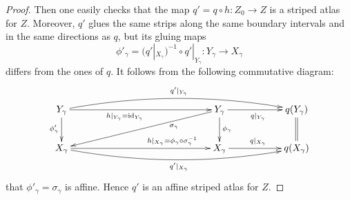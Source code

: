 \documentclass[12pt, reqno]{amsart}
\newcommand\dif{h}
\newcommand{\stripSurf}{Z}
\newcommand{\preStripSurf}{\stripSurf_0}
\newcommand{\bdX}{X}
\newcommand{\bdY}{Y}
\newcommand{\bdGlueInd}{{\gamma}}
\newcommand{\id}{\mathrm{id}}
\newcommand{\qmap}{q}
\begin{document}
\begin{proof}
Then one easily checks that the map $\qmap' = \qmap\circ\dif: \preStripSurf \to \stripSurf$ is a striped atlas for $\stripSurf$.
Moreover, $\qmap'$ glues the same strips along the same boundary intervals and in the same directions as $\qmap$, but its gluing maps
\[
\phi'_{\bdGlueInd} = \bigl(\qmap'|_{\bdX_{\bdGlueInd}}\bigr)^{-1} \circ  \qmap'|_{\bdY_{\bdGlueInd}}: \bdY_{\bdGlueInd} \to \bdX_{\bdGlueInd}
\]
differs from the ones of $\qmap$.
It follows from the following commutative diagram:
\[
\xymatrix{
\bdY_{\bdGlueInd} 
  \ar[rrrrr]_(.4){\dif|_{\bdY_{\bdGlueInd}} = \id_{\bdY_{\bdGlueInd}} } 
  \ar[d]_{\phi'_{\bdGlueInd}}
  \ar@/^1pc/[rrrrrrr]^{\qmap'|_{\bdY_\bdGlueInd}}
   &&&&&
\bdY_{\bdGlueInd}
  \ar[rr]_{\qmap|_{\bdY_{\bdGlueInd}}} 
  \ar[d]^{\phi_{\bdGlueInd} } 
  \ar[dlllll]^(.3){\sigma_{\bdGlueInd} } 
  &&
\qmap(\bdY_{\bdGlueInd}) 
  \ar@{=}[d] \\
\bdX_{\bdGlueInd} 
  \ar@/_1pc/[rrrrrrr]_{\qmap'|_{\bdX_\bdGlueInd}}
  \ar[rrrrr]^(.7){\dif|_{\bdX_{\bdGlueInd}} = \phi_{\bdGlueInd} \circ\sigma^{-1}_{\bdGlueInd} } &&&&&
\bdX_{\bdGlueInd} 
  \ar[rr]^{\qmap|_{\bdX_\bdGlueInd}} &&
\qmap(\bdX_{\bdGlueInd}) 
}
\]
that $\phi'_{\bdGlueInd} = \sigma_{\bdGlueInd}$ is affine.
Hence $\qmap'$ is an affine striped atlas for $\stripSurf$.
\end{proof}
\end{document}
